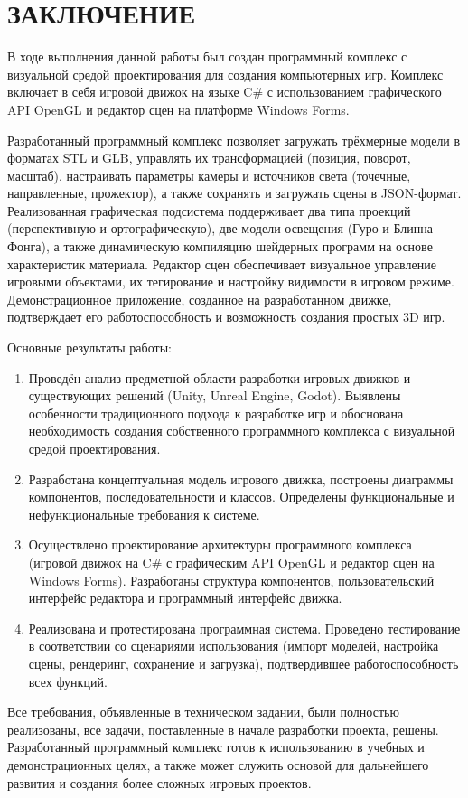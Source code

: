 \section*{ЗАКЛЮЧЕНИЕ}

В ходе выполнения данной работы был создан программный комплекс с визуальной средой проектирования для создания компьютерных игр. Комплекс включает в себя игровой движок на языке C\# с использованием графического API OpenGL и редактор сцен на платформе Windows Forms.

Разработанный программный комплекс позволяет загружать трёхмерные модели в форматах STL и GLB, управлять их трансформацией (позиция, поворот, масштаб), настраивать параметры камеры и источников света (точечные, направленные, прожектор), а также сохранять и загружать сцены в JSON-формат. Реализованная графическая подсистема поддерживает два типа проекций (перспективную и ортографическую), две модели освещения (Гуро и Блинна-Фонга), а также динамическую компиляцию шейдерных программ на основе характеристик материала. Редактор сцен обеспечивает визуальное управление игровыми объектами, их тегирование и настройку видимости в игровом режиме. Демонстрационное приложение, созданное на разработанном движке, подтверждает его работоспособность и возможность создания простых 3D игр.

Основные результаты работы:

\begin{enumerate}
	\item Проведён анализ предметной области разработки игровых движков и существующих решений (Unity, Unreal Engine, Godot). Выявлены особенности традиционного подхода к разработке игр и обоснована необходимость создания собственного программного комплекса с визуальной средой проектирования.
	
	\item Разработана концептуальная модель игрового движка, построены диаграммы компонентов, последовательности и классов. Определены функциональные и нефункциональные требования к системе.
	
	\item Осуществлено проектирование архитектуры программного комплекса (игровой движок на C\# с графическим API OpenGL и редактор сцен на Windows Forms). Разработаны структура компонентов, пользовательский интерфейс редактора и программный интерфейс движка.
	
	\item Реализована и протестирована программная система. Проведено тестирование в соответствии со сценариями использования (импорт моделей, настройка сцены, рендеринг, сохранение и загрузка), подтвердившее работоспособность всех функций.
\end{enumerate}

Все требования, объявленные в техническом задании, были полностью реализованы, все задачи, поставленные в начале разработки проекта, решены. Разработанный программный комплекс готов к использованию в учебных и демонстрационных целях, а также может служить основой для дальнейшего развития и создания более сложных игровых проектов.  
